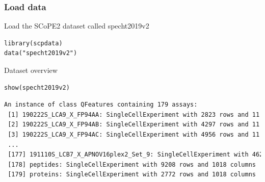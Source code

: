 \documentclass{beamer}
\newcommand{\hcode}[2][lgray]{{\ttfamily\color{vdgray}\colorbox{#1}{#2}}}
\newcommand{\frametitlesection}[1]{\frametitle{\centering #1 \footnotesize \hspace{0pt plus 1 filll} \insertsection}}
\begin{document}
\begin{frame}[fragile]
    \frametitlesection{Load data}
    
    Load the SCoPE2 dataset called \hcode{specht2019v2}
    
    \begin{lstlisting}
library(scpdata)
data("specht2019v2")
    \end{lstlisting}
    
    Dataset overview
    
    \begin{lstlisting}
show(specht2019v2)
    \end{lstlisting}
    
    \begin{lstlisting}[language = TeX, numbers = none, basicstyle = \tiny\ttfamily\color{vdgray}]
An instance of class QFeatures containing 179 assays:
 [1] 190222S_LCA9_X_FP94AA: SingleCellExperiment with 2823 rows and 11 col...
 [2] 190222S_LCA9_X_FP94AB: SingleCellExperiment with 4297 rows and 11 col...
 [3] 190222S_LCA9_X_FP94AC: SingleCellExperiment with 4956 rows and 11 col...
 ...
 [177] 191110S_LCB7_X_APNOV16plex2_Set_9: SingleCellExperiment with 4626 r...
 [178] peptides: SingleCellExperiment with 9208 rows and 1018 columns
 [179] proteins: SingleCellExperiment with 2772 rows and 1018 columns
    \end{lstlisting}
\end{frame}
\end{document}
